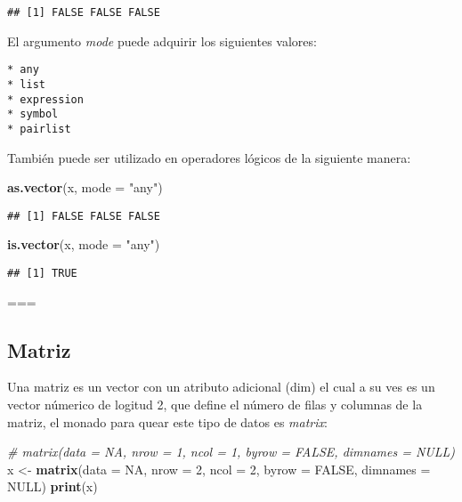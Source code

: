 \documentclass[11pt,]{article}
\newenvironment{Shaded}{\begin{snugshade}}{\end{snugshade}}
\newcommand{\CommentTok}[1]{\textcolor[rgb]{0.56,0.35,0.01}{\textit{#1}}}
\newcommand{\DataTypeTok}[1]{\textcolor[rgb]{0.13,0.29,0.53}{#1}}
\newcommand{\DecValTok}[1]{\textcolor[rgb]{0.00,0.00,0.81}{#1}}
\newcommand{\KeywordTok}[1]{\textcolor[rgb]{0.13,0.29,0.53}{\textbf{#1}}}
\newcommand{\NormalTok}[1]{#1}
\newcommand{\OtherTok}[1]{\textcolor[rgb]{0.56,0.35,0.01}{#1}}
\newcommand{\StringTok}[1]{\textcolor[rgb]{0.31,0.60,0.02}{#1}}
\begin{document}
\begin{verbatim}
## [1] FALSE FALSE FALSE
\end{verbatim}

El argumento \emph{mode} puede adquirir los siguientes valores:

\begin{verbatim}
* any
* list
* expression
* symbol
* pairlist
\end{verbatim}

También puede ser utilizado en operadores lógicos de la siguiente
manera:

\begin{Shaded}
\begin{Highlighting}[]
\KeywordTok{as.vector}\NormalTok{(x, }\DataTypeTok{mode =} \StringTok{"any"}\NormalTok{)}
\end{Highlighting}
\end{Shaded}

\begin{verbatim}
## [1] FALSE FALSE FALSE
\end{verbatim}

\begin{Shaded}
\begin{Highlighting}[]
\KeywordTok{is.vector}\NormalTok{(x, }\DataTypeTok{mode =} \StringTok{"any"}\NormalTok{)}
\end{Highlighting}
\end{Shaded}

\begin{verbatim}
## [1] TRUE
\end{verbatim}

===

\hypertarget{matriz}{%
\subsection{Matriz}\label{matriz}}

Una matriz es un vector con un atributo adicional (dim) el cual a su ves
es un vector númerico de logitud 2, que define el número de filas y
columnas de la matriz, el monado para quear este tipo de datos es
\emph{matrix}:

\begin{Shaded}
\begin{Highlighting}[]
\CommentTok{# matrix(data = NA, nrow = 1, ncol = 1, byrow = FALSE, dimnames = NULL)}
\NormalTok{x <-}\StringTok{ }\KeywordTok{matrix}\NormalTok{(}\DataTypeTok{data =} \OtherTok{NA}\NormalTok{, }\DataTypeTok{nrow =} \DecValTok{2}\NormalTok{, }\DataTypeTok{ncol =} \DecValTok{2}\NormalTok{, }\DataTypeTok{byrow =} \OtherTok{FALSE}\NormalTok{, }\DataTypeTok{dimnames =} \OtherTok{NULL}\NormalTok{)}
\KeywordTok{print}\NormalTok{(x)}
\end{Highlighting}
\end{Shaded}
\end{document}
